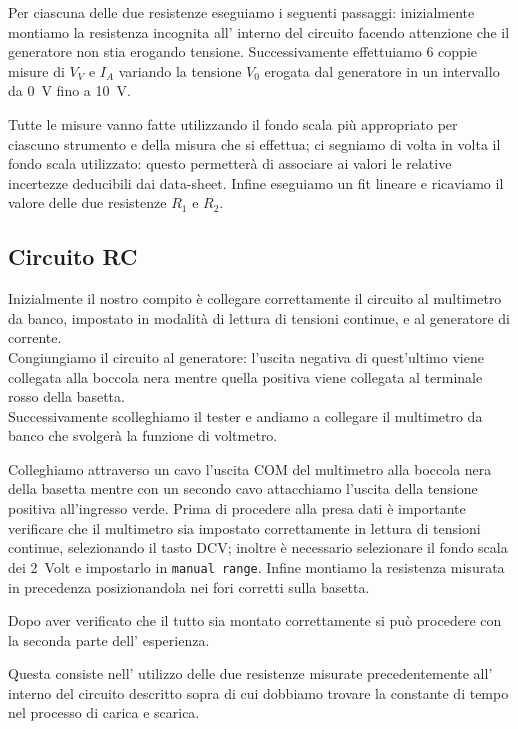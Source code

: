 \documentclass[
    reprint, 
    superscriptaddress, 
    altaffilletter, 
    amsmath, 
    amssymb, 
    a4paper
]{revtex4-2}
\begin{document}
    Per ciascuna delle due resistenze eseguiamo i seguenti passaggi: inizialmente montiamo la resistenza incognita  all’ interno del circuito facendo attenzione che il generatore non stia erogando tensione. Successivamente effettuiamo 6  coppie misure di $V_V$ e $I_A$ variando la tensione $V_0$ erogata dal generatore in un intervallo da 0~V fino a 10~V.  

    Tutte le misure vanno fatte utilizzando il fondo scala più appropriato per ciascuno strumento e della misura che si effettua; ci segniamo di volta in volta il fondo scala utilizzato: questo permetterà di associare ai valori le relative incertezze deducibili dai data-sheet. Infine eseguiamo un fit lineare e ricaviamo il valore delle due resistenze $R_1$ e $R_2$.

    \subsection{Circuito RC}

    Inizialmente il nostro compito è collegare correttamente il circuito al multimetro da banco, impostato in modalità di lettura di tensioni continue, e al generatore di corrente.\\
    Congiungiamo il circuito al generatore: l’uscita negativa di quest’ultimo viene collegata alla boccola nera mentre quella positiva viene collegata al terminale rosso della basetta.\\
    Successivamente scolleghiamo il tester e andiamo a collegare il multimetro da banco che svolgerà la funzione di voltmetro.

    Colleghiamo attraverso un cavo l’uscita COM del multimetro alla boccola nera della basetta mentre con un secondo cavo attacchiamo l’uscita della tensione positiva all’ingresso verde. Prima di procedere alla presa dati è importante verificare che il multimetro sia impostato correttamente in lettura di tensioni continue, selezionando il tasto DCV; inoltre è necessario selezionare il fondo scala dei 2~Volt e impostarlo in \verb|manual range|. Infine montiamo la resistenza misurata in precedenza posizionandola nei fori corretti sulla basetta.

    Dopo aver verificato che il tutto sia montato correttamente si può procedere con la seconda parte dell’ esperienza.

    Questa consiste nell’ utilizzo delle due resistenze misurate precedentemente all’ interno del circuito descritto sopra di cui dobbiamo trovare la constante di tempo nel processo di carica e scarica.
\end{document}
